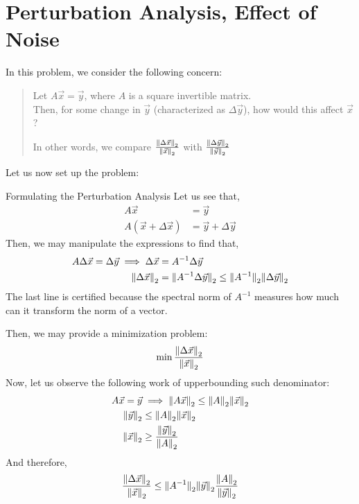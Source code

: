 \section{Perturbation Analysis, Effect of Noise}
In this problem, we consider the following concern:
\begin{quote}
    Let $A \vec{x} = \vec{y}$, where $A$ is a square invertible matrix. \\
    Then, for some change in $\vec{y}$ (characterized as $\Delta \vec{y}$), how would this affect $\vec{x}$?
    \par
    In other words, we compare $\frac{{\| \Delta \vec{x} \|}_{2}^{}}{{\| \vec{x} \|}_{2}^{}}$ with $\frac{{\| \Delta \vec{y} \|}_{2}^{}}{{\| \vec{y} \|}_{2}^{}}$
\end{quote}
Let us now set up the problem:
\begin{ln-explain}{Formulating the Perturbation Analysis}{}
    Let us see that,
    \begin{align*}
        A \vec{x} &= \vec{y} \\
        A (\vec{x} + \Delta \vec{x}) &= \vec{y} + \Delta \vec{y}
    \end{align*}
    Then, we may manipulate the expressions to find that,
    \begin{align*}
        A \Delta \vec{x} = \Delta \vec{y} \implies \Delta \vec{x} &= A^{-1} \Delta \vec{y} \\
        {\| \Delta \vec{x} \|}_{2}^{} &= {\| A^{-1} \Delta \vec{y} \|}_{2}^{} \leq {\| A^{-1} \|}_{2}^{} {\| \Delta \vec{y} \|}_{2}^{}
    \end{align*}
    The last line is certified because the spectral norm of $A^{-1}$ measures how much can it transform the norm of a vector.
    \par
    Then, we may provide a minimization problem:
    \[
        \min \frac{{\| \Delta \vec{x} \|}_{2}^{}}{{\| \vec{x} \|}_{2}^{}}
    \]
    Now, let us observe the following work of upperbounding such denominator:
    \begin{align*}
        A \vec{x} = \vec{y} &\implies {\| A \vec{x} \|}_{2}^{} \leq {\| A \|}_{2}^{} {\| \vec{x} \|}_{2}^{} \\
        {\| \vec{y} \|}_{2}^{} &\leq {\| A \|}_{2}^{} {\| \vec{x} \|}_{2}^{} \\
        {\| \vec{x} \|}_{2}^{} &\geq \frac{{\| \vec{y} \|}_{2}^{}}{{\| A \|}_{2}^{}}
    \end{align*}
    And therefore,
    \begin{align*}
        \frac{\pnorm{\Delta \vec{x}}{2}}{\pnorm{\vec{x}}{2}}
        &\leq \pnorm{A^{-1}}{2} \pnorm{\vec{y}}{2} \frac{\pnorm{A}{2}}{\pnorm{\vec{y}}{2}} \\

\end{align*}
\end{ln-explain}
